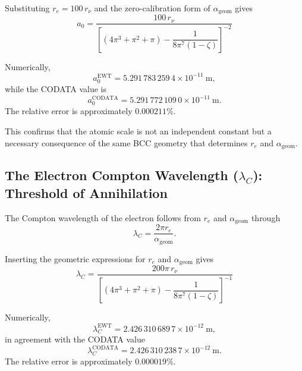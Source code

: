 \documentclass[10pt,a4paper]{article}
\begin{document}
Substituting \(r_e = 100\,r_\nu\) and the zero-calibration form of \(\alpha_{\text{geom}}\) gives
\begin{equation}
	\boxed{
		a_0
		=
		\frac{
			100\,r_\nu
		}{
			\left[
			(4\pi^3 + \pi^2 + \pi)
			-
			\dfrac{1}{8\pi^7(1-\zeta)}
			\right]^{-2}
		}
	}
	\label{eq:bohr_geometric}
\end{equation}

Numerically,
\begin{equation}
	a_0^{\text{EWT}}
	=
	5.291\,783\,259\,4 \times 10^{-11}\ \text{m},
\end{equation}
while the CODATA value is
\begin{equation}
	a_0^{\text{CODATA}}
	=
	5.291\,772\,109\,0 \times 10^{-11}\ \text{m}.
\end{equation}
The relative error is approximately \(0.000211\%\).

This confirms that the atomic scale is not an independent constant but a necessary consequence of the same BCC geometry that determines \(r_e\) and \(\alpha_{\text{geom}}\).

\subsection{The Electron Compton Wavelength (\(\lambda_C\)): Threshold of Annihilation}
\label{sec:compton_wavelength}

The Compton wavelength of the electron follows from \(r_e\) and \(\alpha_{\text{geom}}\) through
\begin{equation}
	\lambda_C = \frac{2\pi r_e}{\alpha_{\text{geom}}}.
	\label{eq:compton_standard}
\end{equation}

Inserting the geometric expressions for \(r_e\) and \(\alpha_{\text{geom}}\) gives
\begin{equation}
	\boxed{
		\lambda_C
		=
		\frac{
			200\pi\,r_\nu
		}{
			\left[
			(4\pi^3 + \pi^2 + \pi)
			-
			\dfrac{1}{8\pi^7(1-\zeta)}
			\right]^{-1}
		}
	}
	\label{eq:compton_geometric}
\end{equation}

Numerically,
\begin{equation}
	\lambda_C^{\text{EWT}}
	=
	2.426\,310\,689\,7 \times 10^{-12}\ \text{m},
\end{equation}
in agreement with the CODATA value
\begin{equation}
	\lambda_C^{\text{CODATA}}
	=
	2.426\,310\,238\,7 \times 10^{-12}\ \text{m}.
\end{equation}
The relative error is approximately \(0.000019\%\).
\end{document}
